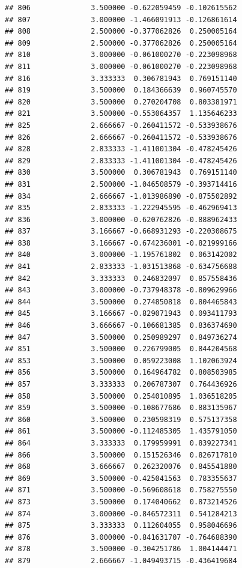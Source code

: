 \documentclass[
]{article}
\begin{document}
\begin{verbatim}
## 806              3.500000 -0.622059459 -0.102615562
## 807              3.000000 -1.466091913 -0.126861614
## 808              2.500000 -0.377062826  0.250005164
## 809              2.500000 -0.377062826  0.250005164
## 810              3.000000 -0.061000270 -0.223098968
## 811              3.000000 -0.061000270 -0.223098968
## 816              3.333333  0.306781943  0.769151140
## 819              3.500000  0.184366639  0.960745570
## 820              3.500000  0.270204708  0.803381971
## 821              3.500000 -0.553064357  1.135646233
## 825              2.666667 -0.260411572 -0.533938676
## 826              2.666667 -0.260411572 -0.533938676
## 828              2.833333 -1.411001304 -0.478245426
## 829              2.833333 -1.411001304 -0.478245426
## 830              3.500000  0.306781943  0.769151140
## 831              2.500000 -1.046508579 -0.393714416
## 834              2.666667 -1.013986890 -0.875502892
## 835              2.833333 -1.222945595 -0.462969413
## 836              3.000000 -0.620762826 -0.888962433
## 837              3.166667 -0.668931293 -0.220308675
## 838              3.166667 -0.674236001 -0.821999166
## 840              3.000000 -1.195761802  0.063142002
## 841              2.833333 -1.031513868 -0.634756688
## 842              3.333333  0.246832097  0.857558436
## 843              3.000000 -0.737948378 -0.809629966
## 844              3.500000  0.274850818  0.804465843
## 845              3.166667 -0.829071943  0.093411793
## 846              3.666667 -0.106681385  0.836374690
## 847              3.500000  0.250989297  0.849736274
## 851              3.500000  0.226799005  0.844204568
## 853              3.500000  0.059223008  1.102063924
## 856              3.500000  0.164964782  0.808503985
## 857              3.333333  0.206787307  0.764436926
## 858              3.500000  0.254010895  1.036518205
## 859              3.500000 -0.108677686  0.883135967
## 860              3.500000  0.230598319  0.575137358
## 861              3.500000 -0.112485305  1.435791050
## 864              3.333333  0.179959991  0.839227341
## 866              3.500000  0.151526346  0.826717810
## 868              3.666667  0.262320076  0.845541880
## 869              3.500000 -0.425041563  0.783355637
## 871              3.500000 -0.569608618  0.758275550
## 873              3.500000  0.174040662  0.873214526
## 874              3.000000 -0.846572311  0.541284213
## 875              3.333333  0.112604055  0.958046696
## 876              3.000000 -0.841631707 -0.764688390
## 878              3.500000 -0.304251786  1.004144471
## 879              2.666667 -1.049493715 -0.436419684

\end{verbatim}
\end{document}
